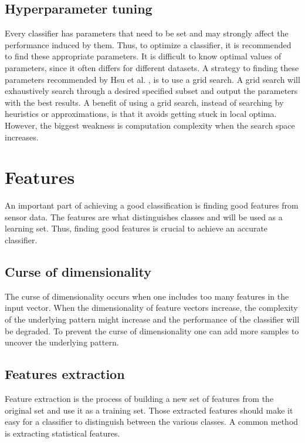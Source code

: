 \documentclass[USenglish]{ifimaster}  %
\begin{document}
\subsection{Hyperparameter tuning}\label{sub:hypt}
Every classifier has parameters that need to be set and may strongly affect the performance induced by them. Thus, to optimize a classifier, it is recommended to find these appropriate parameters. It is difficult to know optimal values of parameters, since it often differs for different datasets. A strategy to finding these parameters recommended by Hsu et al. \cite{Hsu10apractical}, is to use a grid search. A grid search will exhaustively search through a desired specified subset and output the parameters with the best results. A benefit of using a grid search, instead of searching by heuristics or approximations, is that it avoids getting stuck in local optima. However, the biggest weakness is computation complexity when the search space increases.


\section{Features} \label{features}
An important part of achieving a good classification is finding good features from sensor data. The features are what distinguishes classes and will be used as a learning set. Thus, finding good features is crucial to achieve an accurate classifier.
	
\subsection{Curse of dimensionality}\label{curseDim}
The curse of dimensionality occurs when one includes too many features in the input vector. When the dimensionality of feature vectors increase, the complexity of the underlying pattern might increase and the performance of the classifier will be degraded. To prevent the curse of dimensionality one can add more samples to uncover the underlying pattern.
	
\subsection{Features extraction} \label{feature_extraction}
Feature extraction is the process of building a new set of features from the original set and use it as a training set. Those extracted features should make it easy for a classifier to distinguish between the various classes. A common method is extracting statistical features.
\end{document}
